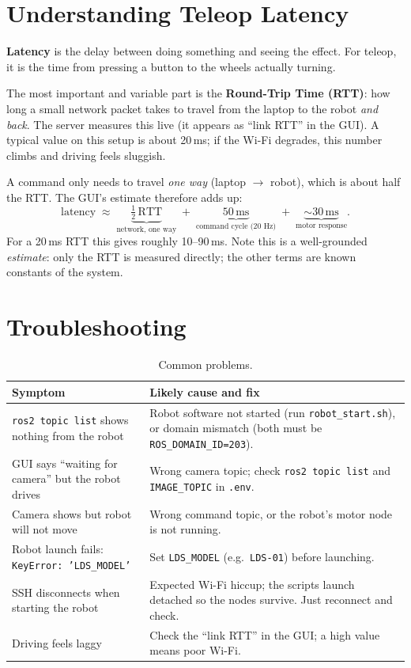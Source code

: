 \documentclass[11pt,a4paper]{article}
\newcommand{\code}[1]{\texttt{#1}}
\begin{document}
\section{Understanding Teleop Latency}
\label{sec:latencymath}
\textbf{Latency} is the delay between doing something and seeing the effect.
For teleop, it is the time from pressing a button to the wheels actually turning.

The most important and variable part is the \textbf{Round-Trip Time (RTT)}: how
long a small network packet takes to travel from the laptop to the robot
\emph{and back}. The server measures this live (it appears as ``link RTT'' in the
GUI). A typical value on this setup is about 20\,ms; if the Wi-Fi degrades, this
number climbs and driving feels sluggish.

A command only needs to travel \emph{one way} (laptop $\rightarrow$ robot), which
is about half the RTT. The GUI's estimate therefore adds up:
\[
\text{latency} \;\approx\;
\underbrace{\tfrac{1}{2}\,\text{RTT}}_{\text{network, one way}}
\;+\;
\underbrace{50\,\text{ms}}_{\text{command cycle (20 Hz)}}
\;+\;
\underbrace{\sim 30\,\text{ms}}_{\text{motor response}}.
\]
For a 20\,ms RTT this gives roughly 10--90\,ms. Note this is a well-grounded
\emph{estimate}: only the RTT is measured directly; the other terms are known
constants of the system.

\section{Troubleshooting}
\begin{table}[h]
\centering
\begin{tabular}{@{}p{5.3cm}p{8.5cm}@{}}
\toprule
\textbf{Symptom} & \textbf{Likely cause and fix} \\
\midrule
\code{ros2 topic list} shows nothing from the robot &
Robot software not started (run \code{robot\_start.sh}), or domain mismatch
(both must be \code{ROS\_DOMAIN\_ID=203}). \\
GUI says ``waiting for camera'' but the robot drives &
Wrong camera topic; check \code{ros2 topic list} and \code{IMAGE\_TOPIC} in \code{.env}. \\
Camera shows but robot will not move &
Wrong command topic, or the robot's motor node is not running. \\
Robot launch fails: \code{KeyError: 'LDS\_MODEL'} &
Set \code{LDS\_MODEL} (e.g.\ \code{LDS-01}) before launching. \\
SSH disconnects when starting the robot &
Expected Wi-Fi hiccup; the scripts launch detached so the nodes survive. Just
reconnect and check. \\
Driving feels laggy &
Check the ``link RTT'' in the GUI; a high value means poor Wi-Fi. \\
\bottomrule
\end{tabular}
\caption{Common problems.}
\end{table}
\end{document}
